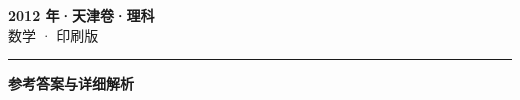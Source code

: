 \documentclass[zihao=5, a4paper]{ctexart}
\begin{document}
\begin{center}
  {\Large\bfseries 2012 年·天津卷·理科}\\[4pt]
  {\large 数学 · 印刷版}
\end{center}
\medskip
{}

\par\bigskip\hrule\bigskip
{}
\begin{center}{\large\bfseries 参考答案与详细解析}\end{center}
\smallskip

\end{document}
